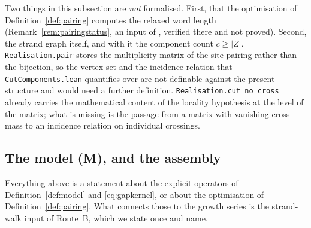 \documentclass[11pt]{article}
\theoremstyle{plain}
\theoremstyle{definition}
\theoremstyle{remark}
\begin{document}
Two things in this subsection are \emph{not} formalised. First, that the optimisation of
Definition~\ref{def:pairing} computes the relaxed word length (Remark~\ref{rem:pairingstatus}, an
input of \cite{Bonfioli2026a}, verified there and not proved). Second, the strand graph itself, and
with it the component count $c\ge|Z|$. \texttt{Realisation.pair} stores the multiplicity matrix of
the site pairing rather than the bijection, so the vertex set and the incidence relation that
\texttt{CutComponents.lean} quantifies over are not definable against the present structure and
would need a further definition. \texttt{Realisation.cut\_no\_cross} already carries the
mathematical content of the locality hypothesis at the level of the matrix; what is missing is the
passage from a matrix with vanishing cross mass to an incidence relation on individual crossings.

\subsection{The model \textup{(M)}, and the assembly}\label{sec:modelassembly}

Everything above is a statement about the explicit operators of Definition~\ref{def:model} and
\eqref{eq:gapkernel}, or about the optimisation of Definition~\ref{def:pairing}. What connects
those to the growth series is the strand-walk input of Route~B, which we state once and name.
\end{document}
